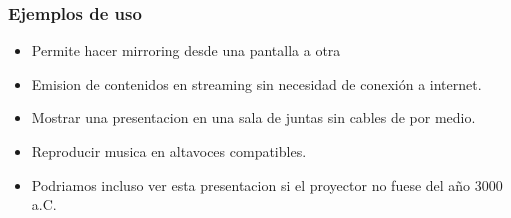 \begin{frame}
  \frametitle{Ejemplos de uso}
  \begin{itemize}
    \pause
  \item Permite hacer mirroring desde una pantalla a otra
    \pause
  \item Emision de contenidos en streaming sin necesidad de conexión a internet.
    \pause
  \item Mostrar una presentacion en una sala de juntas sin cables de por medio.
    \pause
  \item Reproducir musica en altavoces compatibles.
    \pause
  \item Podriamos incluso ver esta presentacion si el proyector no fuese del año 3000 a.C.
  \end{itemize}
\end{frame}
